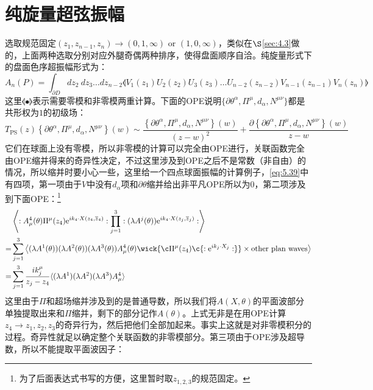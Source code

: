 \section{纯旋量超弦振幅}
选取规范固定$(z_1,z_{n-1},z_n)\to(0,1,\infty)\text{ or }(1,0,\infty)$，类似在$\S$\ref{sec:4.3}做的，上面两种选取分别对应外腿奇偶两种排序，使得盘面顺序自洽。纯旋量形式下的盘面色序超振幅形式为：
\begin{equation}
	A_n(P)=\int_{\partial D}dz_2\mathrm{~}dz_3\ldots dz_{n-2}\llangle V_1(z_1)U_2(z_2)U_3(z_3)\ldots U_{n-2}(z_{n-2})V_{n-1}(z_{n-1})V_n(z_n)\rrangle
\end{equation}
这里$\llangle\bullet\rrangle$表示需要零模和非零模两重计算。下面的OPE说明$\{ \partial\theta^\alpha, \Pi^\mu,d_\alpha, N^{\mu\nu} \}$都是共形权为$1$的初级场：
\begin{equation}
	T_{\mathrm{PS}}(z) \left\{ \partial\theta^{\alpha}, \Pi^{\mu}, d_{\alpha}, N^{\mu\nu} \right\}(w) \sim \frac{\left\{ \partial\theta^{\alpha}, \Pi^{\mu}, d_{\alpha}, N^{\mu\nu} \right\}(w)}{(z-w)^{2}} + \frac{\partial \left\{ \partial\theta^{\alpha}, \Pi^{\mu}, d_{\alpha}, N^{\mu\nu} \right\}(w)}{z-w}
\end{equation}
它们在球面上没有零模，所以非零模的计算可以完全由OPE进行，关联函数完全由OPE缩并得来的奇异性决定\cite{Berkovits:2004px}，不过这里涉及到OPE之后不是常数（非自由）的情况，所以缩并时要小心一些，这里给一个四点球面振幅的计算例子，\ref{eq:5.39}中有四项，第一项由于$V$中没有$d_\alpha$项和$\partial\theta$缩并给出非平凡OPE所以为$0$，第二项涉及到下面OPE：\footnote{为了后面表达式书写的方便，这里暂时取$z_{1,2,3}$的规范固定。}
\begin{equation}
	\begin{aligned}
		&\left\langle :A_\mu^4(\theta)\Pi^\mu(z_4)\mathrm{e}^{ik_4\cdot X(z_4,\overline{z}_4)}:\prod_{j=1}^3:(\lambda A^j(\theta))\mathrm{e}^{ik_4\cdot X(z_j,\overline{z}_j)}:\right\rangle\\
		=&\sum_{j=1}^3\left\langle(\lambda A^1(\theta))(\lambda A^2(\theta))(\lambda A^3(\theta))A_\mu^4(\theta)\wick{\c\Pi^\mu(z_4)\c{:\mathrm{e}^{ik_j\cdot X_j}:}}\times \text{other plan waves}\right\rangle\\
		=& \sum_{j=1}^3\frac{ik_j^\mu}{z_j-z_4}\langle(\lambda A^1)(\lambda A^2)(\lambda A^3)A_\mu^4\rangle
	\end{aligned}
\end{equation}
这里由于$\Pi$和超场缩并涉及到的是普通导数，所以我们将$A(X,\theta)$的平面波部分单独提取出来和$\Pi$缩并，剩下的部分记作$A(\theta)$。上式无非是在用OPE计算$z_4\to z_1,z_2,z_3$的奇异行为，然后把他们全部加起来。事实上这就是对非零模积分的过程。奇异性就足以确定整个关联函数的非零模部分。第三项由于OPE涉及超导数，所以不能提取平面波因子：
